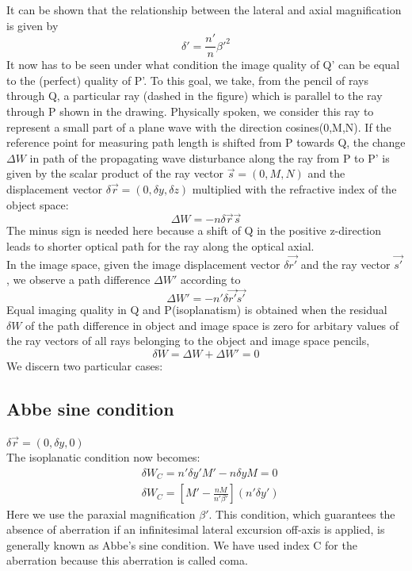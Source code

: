 \documentclass[../main.tex]{subfiles}
\begin{document}
	It can be shown that the relationship between the lateral and axial magnification is given by 
	\begin{equation}
	\delta' = \frac{n'}{n}\beta'^2
	\end{equation}
	It now has to be seen under what condition the image quality of Q' can be equal to the (perfect) quality of P'. To this goal, we take, from the pencil of rays through Q, a particular ray (dashed in the figure) which is parallel to the ray through P shown in the drawing. Physically spoken, we consider this ray to represent a small part of a plane wave with the direction cosines(0,M,N). If the reference point for measuring path length is shifted from P towards Q, the change $\Delta W$ in path of the propagating wave disturbance along the ray from P to P' is given by the scalar product of the ray vector $\vec{s}=(0,M,N)$ and the displacement vector $\delta \vec{r}=(0,\delta{y},\delta{z})$ multiplied with the refractive index of the object space:
	\begin{equation}
	\Delta{W}=-n\delta{\vec{r}}\vec{s}
	\end{equation}
	The minus sign is needed here because a shift of Q in the positive z-direction leads to shorter optical path for the ray along the optical axial.\\
	In the image space, given the image displacement vector $\delta{\vec{r'}}$ and the ray vector $\vec{s'}$, we observe a path difference $\Delta{W'}$ according to 
	\begin{equation}
	\Delta{W'}=-n'\delta{\vec{r'}}\vec{s'}
	\end{equation}
	Equal imaging quality in Q and P(isoplanatism) is obtained when the residual $\delta{W}$ of the path difference in object and image space is zero for arbitary values of the ray vectors of all rays belonging to the object and image space pencils, 
	\begin{equation}
	\delta{W}=\Delta{W}+\Delta{W'}=0
	\end{equation}
	We discern two particular cases:

	\subsection{Abbe sine condition}
	$\delta \vec{r}=(0,\delta{y},0)$\\
	The isoplanatic condition now becomes:\\
	\begin{align}
	&\delta{W_C}=n'\delta{y'}{M'}-n\delta{y}{M}=0\\
	&\delta{W_C}=\left[M'-\frac{nM}{n'\beta'}\right](n'\delta{y'})
	\end{align}
	Here we use the paraxial magnification $\beta'$. This condition, which guarantees the absence of aberration if an infinitesimal lateral excursion off-axis is applied, is generally known as Abbe's sine condition. We have used index C for the aberration because this aberration is called coma.
\end{document}
